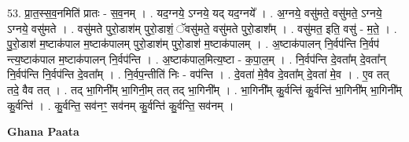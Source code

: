 \documentclass[17pt]{extarticle}
\begin{document}
53. प्रा॒त॒स्स॒व॒नमिति॑ प्रातः - स॒व॒नम् । . यद॒ग्नये॒ ऽग्नये॒ यद् यद॒ग्नये᳚ । . अ॒ग्नये॒ वसु॑मते॒ वसु॑मते॒ ऽग्नये॒ ऽग्नये॒ वसु॑मते । . वसु॑मते पुरो॒डाश॑म् पुरो॒डाशं॒ ॅवसु॑मते॒ वसु॑मते पुरो॒डाश᳚म् । . वसु॑मत॒ इति॒ वसु॑ - म॒ते॒ । . पु॒रो॒डाश॑ म॒ष्टाक॑पाल म॒ष्टाक॑पालम् पुरो॒डाश॑म् पुरो॒डाश॑ म॒ष्टाक॑पालम् । . अ॒ष्टाक॑पालन् नि॒र्वप॑न्ति नि॒र्वप॑ न्त्य॒ष्टाक॑पाल म॒ष्टाक॑पालन् नि॒र्वप॑न्ति । . अ॒ष्टाक॑पाल॒मित्य॒ष्टा - क॒पा॒ल॒म् । . नि॒र्वप॑न्ति दे॒वता᳚म् दे॒वता᳚न् नि॒र्वप॑न्ति नि॒र्वप॑न्ति दे॒वता᳚म् । . नि॒र्वप॒न्तीति॑ निः - वप॑न्ति । . दे॒वता॑ मे॒वैव दे॒वता᳚म् दे॒वता॑ मे॒व । . ए॒व तत् तदे॒ वैव तत् । . तद् भा॒गिनी᳚म् भा॒गिनी॒म् तत् तद् भा॒गिनी᳚म् । . भा॒गिनी᳚म् कु॒र्वन्ति॑ कु॒र्वन्ति॑ भा॒गिनी᳚म् भा॒गिनी᳚म् कु॒र्वन्ति॑ । . कु॒र्वन्ति॒ सव॑नꣳ॒॒ सव॑नम् कु॒र्वन्ति॑ कु॒र्वन्ति॒ सव॑नम् । \newline

\textbf{Ghana Paata } \newline
\end{document}
